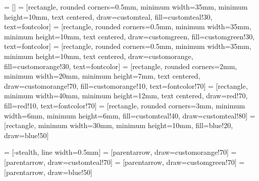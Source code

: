  = [] %
 = [rectangle, rounded corners=0.5mm, minimum width=35mm, minimum height=10mm, text centered, draw=customteal, fill=customteal!30, text=fontcolor]
 = [rectangle, rounded corners=0.5mm, minimum width=35mm, minimum height=10mm, text centered, draw=customgreen, fill=customgreen!30, text=fontcolor]
 = [rectangle, rounded corners=0.5mm, minimum width=35mm, minimum height=10mm, text centered, draw=customorange, fill=customorange!30, text=fontcolor]
 = [rectangle, rounded corners=2mm, minimum width=20mm, minimum height=7mm, text centered, draw=customorange!70, fill=customorange!10, text=fontcolor!70]
 = [rectangle, minimum width=40mm, minimum height=12mm, text centered, draw=red!70, fill=red!10, text=fontcolor!70]
 = [rectangle, rounded corners=3mm, minimum width=6mm, minimum height=6mm, fill=customteal!40, draw=customteal!80]
 = [rectangle, minimum width=30mm, minimum height=10mm, fill=blue!20, draw=blue!50]

 = [-stealth, line width=0.5mm]
 = [parentarrow, draw=customorange!70]
 = [parentarrow, draw=customteal!70]
 = [parentarrow, draw=customgreen!70]
 = [parentarrow, draw=blue!50]


